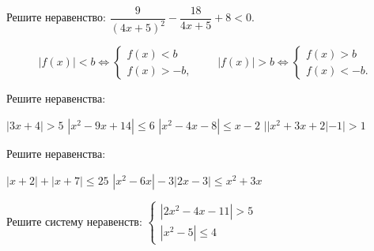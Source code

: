 \begin{class}[number=5]
		\begin{listofex}
		\item Решите неравенство: \( \dfrac{ 9 }{ (4x+5)^2 } - \dfrac{ 18 }{ 4x+5 } + 8 < 0 \).
	\end{listofex}
	\begin{definit}
		\[ |f(x)|<b \Leftrightarrow \begin{cases} f(x)<b \\ f(x) > -b, \end{cases} \qquad |f(x)|>b \Leftrightarrow \begin{cases} f(x)>b \\ f(x) < -b. \end{cases} \]
	\end{definit}
	\begin{listofex}[resume]
		\item Решите неравенства: %
		\begin{tasks}
			\task \( |3x+4| > 5 \)
			\task \( |x^2-9x+14| \le 6 \)
			\task \( |x^2-4x-8| \le x-2 \)
			\task \( ||x^2+3x+2| - 1| > 1 \)
			
		\end{tasks}
		\item Решите неравенства: %
		\begin{tasks}
			\task \( |x+2|+|x+7| \le 25 \)
			\task \( |x^2-6x|-3|2x-3| \le x^2+3x \)
		\end{tasks}
		\item Решите систему неравенств: \( \begin{cases} |2x^2-4x-11| > 5 \\ |x^2-5| \le 4 \end{cases} \)
	\end{listofex}
\end{class}

